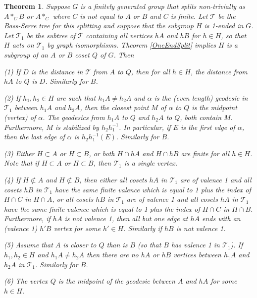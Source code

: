 \documentclass[10pt,a4paper]{amsart}
\newtheorem{theorem}{Theorem}
\begin{document}
\begin{theorem}
Suppose $G$ is a finitely generated group that splits non-trivially as  $A\ast_C B$ or $A\ast_C$ where $C$ is not equal to $A$ or $B$ and $C$ is finite. Let $\mathcal T$ be the Bass-Serre tree for this splitting and suppose that the subgroup  $H$ is 1-ended in  $G$. Let $\mathcal T_1$ be the subtree of $\mathcal T$ containing all vertices $hA$ and $hB$ for $h\in H$, so that $H$ acts on $\mathcal T_1$ by graph isomorphisms. Theorem \ref{OneEndSplit} implies $H$ is a subgroup of an $A$ or $B$ coset $Q$ of $G$. Then

(1) If $D$ is the distance in $\mathcal T$ from $A$ to $Q$, then for all $h\in H$, the distance from $hA$ to $Q$ is $D$. Similarly for $B$. 

(2) If $h_1, h_2\in H$ are such that $h_1A\ne h_2A$ and $\alpha$ is the (even length) geodesic in $\mathcal T_1$ between $h_1A$ and $h_2A$, then the closest point $M$ of $\alpha$ to $Q$  is the midpoint (vertex) of $\alpha$. The geodesics from $h_1A$ to $Q$ and $h_2A$ to $Q$, both contain $M$. Furthermore, $M$ is stabilized by $h_2h_1^{-1}$. In particular, if $E$ is the first edge of $\alpha$, then the last edge of $\alpha$ is $h_2h_1^{-1}(E)$. Similarly for $B$.

(3) Either $H\subset A$ or $H\subset B$, or both $H\cap hA$ and $H\cap hB$ are finite for all $h\in H$. Note that if $H\subset A$ or $H\subset B$, then $\mathcal T_1$ is a single vertex. 

(4) If $H\not\subset A$ and $H\not\subset B$, then either all cosets $hA$ in $\mathcal T_1$ are of valence 1 and all cosets $hB$ in $\mathcal T_1$ have the same finite valence which is equal to 1 plus the index of $H\cap C$ in $H\cap A$, or all cosets $hB$ in $\mathcal T_1$ are of valence 1 and all cosets $hA$ in $\mathcal T_1$ have the same finite valence which is equal to 1 plus the index of $H\cap C$ in $H\cap B$. Furthermore, if $hA$ is not valence 1, then all but one edge at $hA$ ends with an (valence 1) $h'B$ vertex for some $h'\in H$. Similarly if $hB$ is not valence 1. 

(5) Assume that $A$ is closer to $Q$ than is $B$ (so that $B$ has valence 1 in $\mathcal T_1$). If $h_1,h_2\in H$ and $h_1A\ne h_2A$ then there are no $hA$ or $hB$ vertices between $h_1A$ and $h_2A$ in $\mathcal T_1$. Similarly for $B$. 

(6) The vertex $Q$ is the midpoint of the geodesic between $A$ and $hA$ for some $h\in H$. 
\end{theorem}
\end{document}
